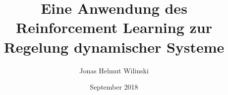 \documentclass[graybox,envcountchap,twoside,deutsch]{lrt_thesis}
\begin{document}
%
\author{Jonas Helmut Wilinski}
\title{Eine Anwendung des Reinforcement Learning zur Regelung dynamischer Systeme}
\date{September 2018}
\maketitle

\fronttitle
\frontmatter
\tableofcontents
\mainmatter


\graphicspath{{figures/}}






%







\finalmatter
\end{document}
